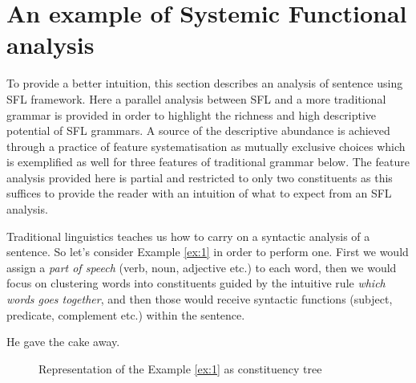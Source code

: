 \section{An example of Systemic Functional analysis}
\label{sec:example}
To provide a better intuition, this section describes an analysis of sentence using SFL framework. Here a parallel analysis between SFL and a more traditional grammar is provided in order to highlight the richness and high descriptive potential of SFL grammars. A source of the descriptive abundance is achieved through a practice of feature systematisation as mutually exclusive choices which is exemplified as well for three features of traditional grammar below. The feature analysis provided here is partial and restricted to only two constituents as this suffices to provide the reader with an intuition of what to expect from an SFL analysis.

Traditional linguistics teaches us how to carry on a syntactic analysis of a sentence. So let's consider Example \ref{ex:1} in order to perform one. First we would assign a \textit{part of speech} (verb, noun, adjective etc.) to each word, then we would focus on clustering words into constituents guided by the intuitive rule \textit{which words goes together}, and then those would receive syntactic functions (subject, predicate, complement etc.) within the sentence.   %

\begin{exe}
    \ex\label{ex:1} He gave the cake away.
\end{exe}

\begin{figure}[!ht]
    \centering
    \caption{Representation of the Example \ref{ex:1} as constituency tree}
    \label{fig:mcg-graph-example-simple-structure}
\end{figure}

